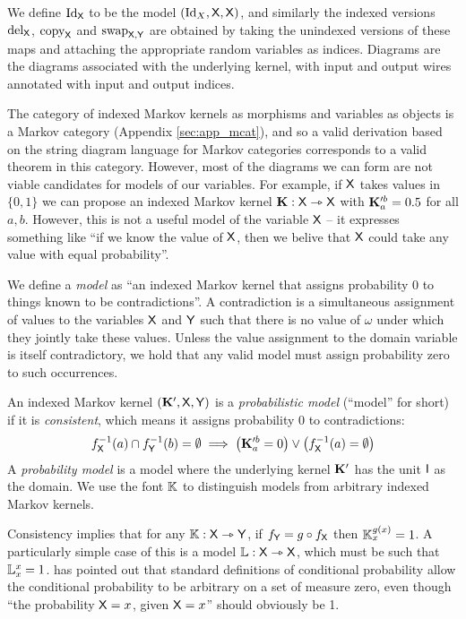 We define $\text{Id}_{\mathsf{X}}$ to be the model $(\text{Id}_X,\mathsf{X},\mathsf{X})$, and similarly the indexed versions $\text{del}_{\mathsf{X}}$, $\text{copy}_{\mathsf{X}}$ and $\text{swap}_{\mathsf{X},\mathsf{Y}}$ are obtained by taking the unindexed versions of these maps and attaching the appropriate random variables as indices. Diagrams are the diagrams associated with the underlying kernel, with input and output wires annotated with input and output indices.

The category of indexed Markov kernels as morphisms and variables as objects is a Markov category (Appendix \ref{sec:app_mcat}), and so a valid derivation based on the string diagram language for Markov categories corresponds to a valid theorem in this category. However, most of the diagrams we can form are not viable candidates for models of our variables. For example, if $\mathsf{X}$ takes values in $\{0,1\}$ we can propose an indexed Markov kernel $\mathbf{K}:\mathsf{X}\rightarrowtriangle\mathsf{X}$ with $\mathbf{K}_a^{\prime b}=0.5$ for all $a, b$. However, this is not a useful model of the variable $\mathsf{X}$ -- it expresses something like ``if we know the value of $\mathsf{X}$, then we belive that $\mathsf{X}$ could take any value with equal probability''.

We define a \emph{model} as ``an indexed Markov kernel that assigns probability 0 to things known to be contradictions''. A contradiction is a simultaneous assignment of values to the variables $\mathsf{X}$ and $\mathsf{Y}$ such that there is no value of $\omega$ under which they jointly take these values. Unless the value assignment to the domain variable is itself contradictory, we hold that any valid model must assign probability zero to such occurrences.

\begin{definition}
An indexed Markov kernel $(\mathbf{K}',\mathsf{X},\mathsf{Y})$ is a \emph{probabilistic model} (``model'' for short) if it is \emph{consistent}, which means it assigns probability 0 to contradictions:
\begin{align}
	f_{\mathsf{X}}^{-1}(a)\cap f_{\mathsf{Y}}^{-1}(b) = \emptyset \implies \left(\mathbf{K}_{a}^{\prime b} = 0\right) \lor \left(f_{\mathsf{X}}^{-1}(a) = \emptyset\right)
\end{align}
A \emph{probability model} is a model where the underlying kernel $\mathbf{K}'$ has the unit $\mathsf{I}$ as the domain. We use the font $\mathbb{K}$ to distinguish models from arbitrary indexed Markov kernels.
\end{definition}

Consistency implies that for any $\mathbb{K}:\mathsf{X}\rightarrowtriangle\mathsf{Y}$, if $f_{\mathsf{Y}}=g\circ f_{\mathsf{X}}$ then $\mathbb{K}_x^{g(x)}=1$. A particularly simple case of this is a model $\mathbb{L}:\mathsf{X}\rightarrowtriangle\mathsf{X}$, which must be such that $\mathbb{L}_x^x=1$. \citet{hajek_what_2003} has pointed out that standard definitions of conditional probability allow the conditional probability to be arbitrary on a set of measure zero, even though ``the probability $\mathsf{X}=x$, given $\mathsf{X}=x$'' should obviously be 1.

